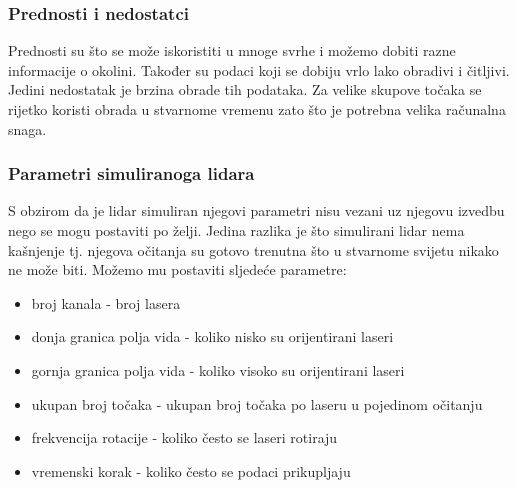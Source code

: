 \subsubsection{Prednosti i nedostatci}

Prednosti su što se može iskoristiti u mnoge svrhe i možemo dobiti razne informacije o okolini. Također su podaci koji se dobiju vrlo lako obradivi i čitljivi. Jedini nedostatak je brzina obrade tih podataka. Za velike skupove točaka se rijetko koristi obrada u stvarnome vremenu zato što je potrebna velika računalna snaga.

\subsubsection{Parametri simuliranoga lidara}

S obzirom da je lidar simuliran njegovi parametri nisu vezani uz njegovu izvedbu nego se mogu postaviti po želji. Jedina razlika je što simulirani lidar nema kašnjenje tj. njegova očitanja su gotovo trenutna što u stvarnome svijetu nikako ne može biti.
Možemo mu postaviti sljedeće parametre:

\begin{itemize}
  \item broj kanala - broj lasera
  \item donja granica polja vida - koliko nisko su orijentirani laseri
  \item gornja granica polja vida - koliko visoko su orijentirani laseri
  \item ukupan broj točaka - ukupan broj točaka po laseru u pojedinom očitanju
  \item frekvencija rotacije - koliko često se laseri rotiraju
  \item vremenski korak - koliko često se podaci prikupljaju
\end{itemize}